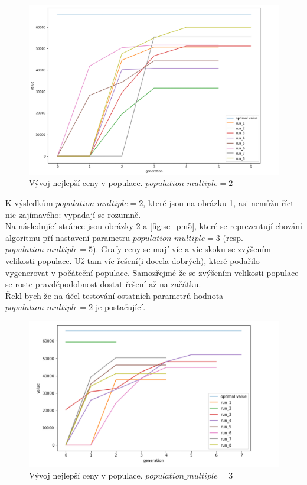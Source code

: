 \documentclass{article}
\begin{document}
\begin{figure}[H]
    \centering
    \includegraphics[width=1\textwidth]{screenshot_1283}
    \caption{Vývoj nejlepší ceny v populace. \(population\_multiple = 2\)}
    \label{fig:se_pm2}
\end{figure}

K výsledkům \(population\_multiple = 2\), které jsou na obrázku \ref{fig:se_pm2}, asi nemůžu říct nic zajímavého: vypadají se rozumně.\\

Na následující stránce jsou obrázky \ref{fig:se_pm3} a \ref{fig:se_pm5}, které se reprezentují chování algoritmu pří nastavení parametru \(population\_multiple=3\) (resp. \(population\_multiple=5\)). Grafy ceny se mají víc a víc skoku se zvýšením velikosti populace. Už tam víc řešení(i docela dobrých), které podařilo vygenerovat v počáteční populace. Samozřejmé že se zvýšením velikosti populace se roste pravděpodobnost dostat řešení až na začátku.\\

Řekl bych že na účel testování ostatních parametrů hodnota \(population\_multiple=2\) je postačující.

\newpage
\begin{figure}[H]
    \centering
    \includegraphics[width=1\textwidth]{screenshot_1284}
    \caption{Vývoj nejlepší ceny v populace. \(population\_multiple = 3\)}
    \label{fig:se_pm3}
\end{figure}
\end{document}
